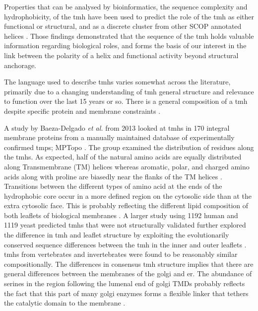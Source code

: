 Properties that can be analysed by bioinformatics, the sequence complexity and hydrophobicity, of the \gls{tmh} have been used to predict the role of the \gls{tmh} as either functional or structural, and as a discrete cluster from other SCOP annotated helices \cite{Wong2012}. Those findings demonstrated that the sequence of the \gls{tmh} holds valuable information regarding biological roles, and forms the basis of our interest in the link between the polarity of a helix and functional activity beyond structural anchorage.

The language used to describe \gls{tmh}s varies somewhat across the literature, primarily due to a changing understanding of \gls{tmh} general structure and relevance to function over the last 15 years or so. There is a general composition of a \gls{tmh} despite specific protein and membrane constraints \cite{Sharpe2010}.

A study by Baeza-Delgado {\it et al.} from 2013 \cite{Baeza-Delgado2013} looked at \gls{tmh}s in 170 integral membrane proteins from a manually maintained database of experimentally confirmed \gls{tmp}s; MPTopo \cite{Jayasinghe2001}. The group examined the distribution of residues along the \gls{tmh}s. As expected, half of the natural amino acids are equally distributed along Transmembrane (TM) helices whereas aromatic, polar, and charged amino acids along with proline are biasedly near the flanks of the TM helices \cite{Baeza-Delgado2013}. Transitions between the different types of amino acid at the ends of the hydrophobic core occur in a more defined region on the cytosolic side than at the extra cytosolic face. This is probably reflecting the different lipid composition of both leaflets of biological membranes \cite{Baeza-Delgado2013}. A larger study using 1192 human and 1119 yeast predicted \gls{tmh}s that were not structurally validated further explored the difference in \gls{tmh} and leaflet structure by exploiting the evolutionarily conserved sequence differences between the \gls{tmh} in the inner and outer leaflets \cite{Sharpe2010}. \gls{tmh}s from vertebrates and invertebrates were found to be reasonably similar compositionally. The differences in consensus \gls{tmh} structure implies that there are general differences between the membranes of the golgi and \gls{er}. The abundance of serines in the region following the lumenal end of golgi TMDs probably reflects the fact that this part of many golgi enzymes forms a flexible linker that tethers the catalytic domain to the membrane \cite{Sharpe2010}.

